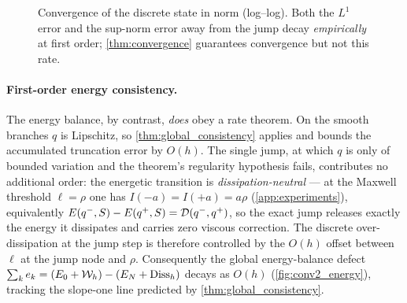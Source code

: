 \begin{figure}[t]
  \centering
  \caption{Convergence of the discrete state in norm (log--log). Both
  the $L^1$ error and the sup-norm error away from the jump decay
  \emph{empirically} at first order; \cref{thm:convergence} guarantees
  convergence but not this rate.}
  \label{fig:conv2_state}
\end{figure}

\paragraph{First-order energy consistency.} The energy balance, by
contrast, \emph{does} obey a rate theorem. On the smooth branches
$q$ is Lipschitz, so \cref{thm:global_consistency} applies and bounds
the accumulated truncation error by $O(h)$. The single jump, at which
$q$ is only of bounded variation and the theorem's regularity hypothesis
fails, contributes no additional order: the energetic transition is
\emph{dissipation-neutral} --- at the Maxwell threshold $\ell=\rho$ one
has $I(-a)=I(+a)=a\rho$ (\cref{app:experiments}), equivalently
$E(q^-,S)-E(q^+,S)=\mathcal{D}(q^-,q^+)$, so the exact jump releases exactly the
energy it dissipates and carries zero viscous correction. The discrete
over-dissipation at the jump step is therefore controlled by the
$O(h)$ offset between $\ell$ at the jump node and $\rho$. Consequently
the global energy-balance defect $\sum_k e_k=(E_0+\mathcal W_h)-(E_N+\mathrm{Diss}_h)$
decays as $O(h)$ (\cref{fig:conv2_energy}), tracking the slope-one line
predicted by \cref{thm:global_consistency}.

